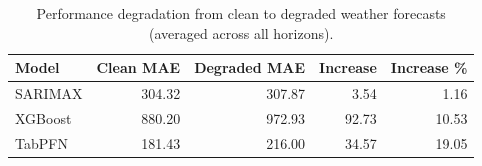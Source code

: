 \begin{table}[h]
\centering
\begin{tabular}{lrrrr}
\toprule
Model & Clean MAE & Degraded MAE & Increase & Increase \% \\
\midrule
SARIMAX & 304.32 & 307.87 & 3.54 & 1.16 \\
XGBoost & 880.20 & 972.93 & 92.73 & 10.53 \\
TabPFN & 181.43 & 216.00 & 34.57 & 19.05 \\
\bottomrule
\end{tabular}
\caption{Performance degradation from clean to degraded weather forecasts (averaged across all horizons).}
\label{tab:degradation_summary}
\end{table}
